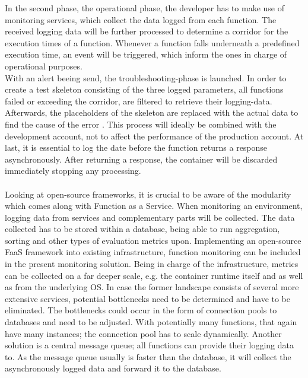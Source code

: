 \documentclass[11pt]{article}
\begin{document}
In the second phase, the operational phase, the developer has to make use of monitoring services, which collect the data logged from each function. The received logging data will be further processed to determine a corridor for the execution times of a function. Whenever a function falls underneath a predefined execution time, an event will be triggered, which inform the ones in charge of operational purposes.\\ With an alert beeing send, the troubleshooting-phase is launched. In order to create a test skeleton consisting of the three logged parameters, all functions failed or exceeding the corridor, are filtered to retrieve their logging-data. Afterwards, the placeholders of the skeleton are replaced with the actual data to find the cause of the error \cite{manner2019troubleshooting}. This process will ideally be combined with the development account, not to affect the performance of the production account. At last, it is essential to log the date before the function returns a response asynchronously. After returning a response, the container will be discarded immediately stopping any processing.\\\\ Looking at open-source frameworks, it is crucial to be aware of the modularity which comes along with Function as a Service. When monitoring an environment, logging data from services and complementary parts will be collected. The data collected has to be stored within a database, being able to run aggregation, sorting and other types of evaluation metrics upon. Implementing an open-source FaaS framework into existing infrastructure, function monitoring can be included in the present monitoring solution. Being in charge of the infrastructure, metrics can be collected on a far deeper scale, e.g. the container runtime itself and as well as from the underlying OS. In case the former landscape consists of several more extensive services, potential bottlenecks need to be determined and have to be eliminated. The bottlenecks could occur in the form of connection pools to databases and need to be adjusted. With potentially many functions, that again have many instances; the connection pool has to scale dynamically. Another solution is a central message queue; all functions can provide their logging data to. As the message queue usually is faster than the database, it will collect the asynchronously logged data and forward it to the database.
\end{document}

